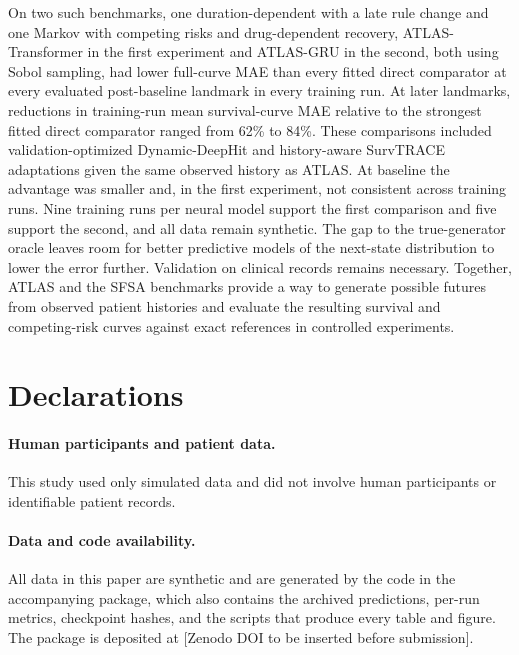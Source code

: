 On two such benchmarks, one duration-dependent with a late rule change and one Markov with competing risks and drug-dependent recovery, ATLAS-Transformer in the first experiment and ATLAS-GRU in the second, both using Sobol sampling, had lower full-curve MAE than every fitted direct comparator at every evaluated post-baseline landmark in every training run. At later landmarks, reductions in training-run mean survival-curve MAE relative to the strongest fitted direct comparator ranged from 62\% to 84\%. These comparisons included validation-optimized Dynamic-DeepHit and history-aware SurvTRACE adaptations given the same observed history as ATLAS. At baseline the advantage was smaller and, in the first experiment, not consistent across training runs. Nine training runs per neural model support the first comparison and five support the second, and all data remain synthetic. The gap to the true-generator oracle leaves room for better predictive models of the next-state distribution to lower the error further. Validation on clinical records remains necessary. Together, ATLAS and the SFSA benchmarks provide a way to generate possible futures from observed patient histories and evaluate the resulting survival and competing-risk curves against exact references in controlled experiments.

\section*{Declarations}
\paragraph{Human participants and patient data.}
This study used only simulated data and did not involve human participants or identifiable patient records.

\paragraph{Data and code availability.}
All data in this paper are synthetic and are generated by the code in the accompanying package, which also contains the archived predictions, per-run metrics, checkpoint hashes, and the scripts that produce every table and figure. The package is deposited at [Zenodo DOI to be inserted before submission].


